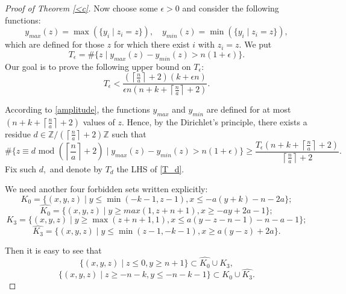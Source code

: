 \documentclass[11pt,leqno]{amsart}
\numberwithin{equation}{section}
\def\Z{\mathbb{Z}}
\begin{document}
\begin{proof}[Proof of Theorem \ref{<c}]
\smallskip

{} Now choose some $\epsilon>0$ and consider the following functions:
$$y_{max}(z)=\max(\{y_i\mid z_i=z\}),\quad y_{min}(z)=\min(\{y_i\mid z_i=z\}),$$
which are defined for those $z$ for which there exist $i$ with $z_i=z.$
We put \begin{equation}\label{T_eps}T_{\epsilon}=\#\{z\mid y_{max}(z)-y_{min}(z)>n(1+\epsilon)\}.\end{equation}
Our goal is to prove the following upper bound on $T_{\epsilon}:$
\begin{equation}\label{T_eps_bound}T_{\epsilon}<
\frac{(\left\lceil\frac{n}a\right\rceil+2)(k+\epsilon n)}{\epsilon n(n+k+\left\lceil\frac{n}a\right\rceil+2)}.\end{equation}

According to \eqref{amplitude}, the functions $y_{max}$ and $y_{min}$ are defined for at most $(n+k+\left\lceil\frac{n}a\right\rceil+2)$
values of $z.$ Hence, by the Dirichlet's principle, there exists a residue $d\in\Z/(\left\lceil\frac{n}a\right\rceil+2)\Z$ such that
\begin{equation}\label{T_d}\#\{z\equiv d \text{ mod }(\left\lceil\frac{n}a\right\rceil+2)\mid y_{max}(z)-y_{min}(z)>n(1+\epsilon)\}\geq \frac{T_{\epsilon}(n+k+\left\lceil\frac{n}a\right\rceil+2)}{\left\lceil\frac{n}a\right\rceil+2}.\end{equation}
Fix such $d,$ and denote by $T_d$ the LHS of \eqref{T_d}.

We need another four forbidden sets written explicitly:
\begin{equation}\label{K_0}K_0=\{(x,y,z)\mid y\leq \min(-k-1,z-1),x\leq -a(y+k)-n-2a\};\end{equation}
\begin{equation}\label{hat(K_0)}\widehat{K_0}=\{(x,y,z)\mid y\geq max(1,z+n+1), x\geq -ay+2a-1\};\end{equation}
\begin{equation}\label{K_3}K_3=\{(x,y,z)\mid y\geq\max(z+n+1,1),x\leq a(y-z-n-1)-n-a-1\};\end{equation}
\begin{equation}\label{hat(K_3)}\widehat{K_3}=\{(x,y,z)\mid y\leq\min(z-1,-k-1), x\geq a(y-z)+2a\}.\end{equation}

Then it is easy to see that
\begin{equation}\label{ygeq n+1}\{(x,y,z)\mid z\leq 0,y\geq n+1\}\subset \widehat{K_0}\cup K_3,\end{equation}
\begin{equation}\label{yleq -n-k-1}\{(x,y,z)\mid z\geq -n-k, y\leq -n-k-1\}\subset K_0\cup \widehat{K_3}.\end{equation}


\end{proof}
\end{document}
